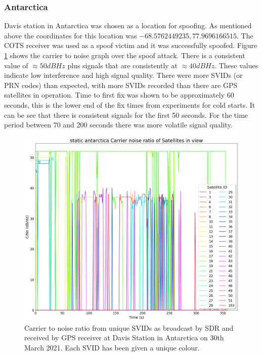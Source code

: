 \subsubsection{Antarctica}
Davis station in Antarctica was chosen as a location for spoofing. As mentioned above the coordinates for this location was $-68.5762449235, 77.9696166515$. The COTS
receiver was used as a spoof victim and it was successfully spoofed. Figure \ref{fig:antarcticaStaticCNo} shows the carrier to noise graph over the spoof attack. There is
a consistent value of $\approx 50 dBHz$ plus signals that are consistently at $\approx 40 dBHz$. These values indicate low interference and high signal quality. There
were more SVIDs (or PRN codes) than expected, with more SVIDs recorded than there are GPS satellites in operation. 
Time to first fix was shown to be approximately 60 seconds, this is the lower end of the fix times from experiments for cold starts. 
It can be see that there is consistent signals for the first 50 seconds. For the time period between 70 and
200 seconds there was more volatile signal quality. 

\begin{figure}[H]
    \begin{centering}
        \includegraphics[width=12cm,keepaspectratio]{Figures/2021_3_30_static_antarctica Carrier noise ratio.png}
        \caption{Carrier to noise ratio from unique SVIDs as broadcast by SDR and received by GPS receiver at Davis Station in Antarctica on 30th March 2021. Each SVID has been given a unique colour.}
        \label{fig:antarcticaStaticCNo}
    \end{centering}
\end{figure}

